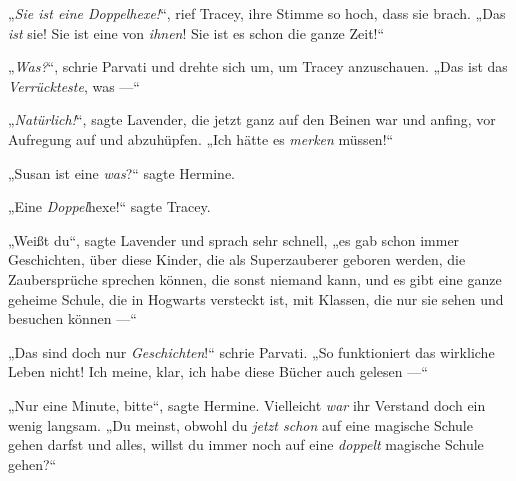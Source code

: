 „\emph{Sie ist eine Doppelhexe!}“, rief Tracey, ihre Stimme so hoch, dass sie brach.
„Das \emph{ist} sie! Sie ist eine von \emph{ihnen}! Sie ist es schon die ganze Zeit!“

„\emph{Was?}“, schrie Parvati und drehte sich um, um Tracey anzuschauen.
„Das ist das \emph{Verrückteste}, was —“

„\emph{Natürlich!}“, sagte Lavender, die jetzt ganz auf den Beinen war und anfing, vor Aufregung auf und abzuhüpfen.
„Ich hätte es \emph{merken} müssen!“

„Susan ist eine \emph{was}?“ sagte Hermine.

„Eine \emph{Doppel}{}hexe!“ sagte Tracey.

„Weißt du“, sagte Lavender und sprach sehr schnell, „es gab schon immer Geschichten, über diese Kinder, die als Superzauberer geboren werden, die Zaubersprüche sprechen können, die sonst niemand kann, und es gibt eine ganze geheime Schule, die in Hogwarts versteckt ist, mit Klassen, die nur sie sehen und besuchen können —“

„Das sind doch nur \emph{Geschichten}!“ schrie Parvati.
„So funktioniert das wirkliche Leben nicht! Ich meine, klar, ich habe diese Bücher auch gelesen —“

„Nur eine Minute, bitte“, sagte Hermine. Vielleicht \emph{war} ihr Verstand doch ein wenig langsam.
„Du meinst, obwohl du \emph{jetzt schon} auf eine magische Schule gehen darfst und alles, willst du immer noch auf eine \emph{doppelt} magische Schule gehen?“

